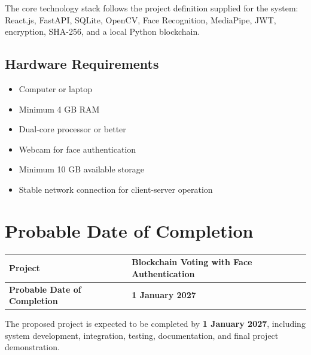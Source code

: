 \documentclass[12pt,a4paper]{report}
\begin{document}
\normalsize

The core technology stack follows the project definition supplied for the system: React.js, FastAPI, SQLite, OpenCV, Face Recognition, MediaPipe, JWT, encryption, SHA-256, and a local Python blockchain.

\section*{Hardware Requirements}

\begin{itemize}
    \item Computer or laptop
    \item Minimum 4 GB RAM
    \item Dual-core processor or better
    \item Webcam for face authentication
    \item Minimum 10 GB available storage
    \item Stable network connection for client-server operation
\end{itemize}

\newpage


\chapter{Probable Date of Completion}

\begin{center}
	
	\vspace{1cm}
	
	\begin{tabular}{|p{7cm}|p{5cm}|}
		\hline
		\textbf{Project} & \textbf{Blockchain Voting with Face Authentication} \\
		\hline
		\textbf{Probable Date of Completion} & \textbf{1 January 2027} \\
		\hline
	\end{tabular}
	
	\vspace{1cm}
	
	The proposed project is expected to be completed by
	\textbf{1 January 2027}, including system development, integration,
	testing, documentation, and final project demonstration.
	
\end{center}
\end{document}
